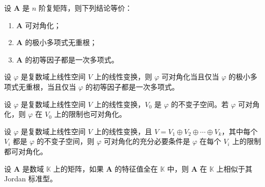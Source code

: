 \begin{corollary}
  设 $\bm{A}$ 是 $n$ 阶复矩阵，则下列结论等价：
  \begin{enumerate}
    \item $\bm{A}$ 可对角化；
    \item $\bm{A}$ 的极小多项式无重根；
    \item $\bm{A}$ 的初等因子都是一次多项式。
  \end{enumerate}
\end{corollary}

\begin{corollary}
  设 $\varphi$ 是复数域上线性空间 $V$ 上的线性变换，则 $\varphi$ 可对角化当且仅当 $\varphi$ 的极小多项式无重根，当且仅当 $\varphi$ 的初等因子都是一次多项式。
\end{corollary}

\begin{corollary}
  设 $\varphi$ 是复数域上线性空间 $V$ 上的线性变换，$V_0$ 是 $\varphi$ 的不变子空间。若 $\varphi$ 可对角化，则 $\varphi$ 在 $V_0$ 上的限制也可对角化。
\end{corollary}

\begin{corollary}
  设 $\varphi$ 是复数域上线性空间 $V$ 上的线性变换，且 $V = V_1 \oplus V_2 \oplus \cdots \oplus V_k$，其中每个 $V_i$ 都是 $\varphi$ 的不变子空间，则 $\varphi$ 可对角化的充分必要条件是 $\varphi$ 在每个 $V_i$ 上的限制都可对角化。
\end{corollary}

\begin{corollary}
  设 $\bm{A}$ 是数域 $\mathbb{K}$ 上的矩阵，如果 $\bm{A}$ 的特征值全在 $\mathbb{K}$ 中，则 $\bm{A}$ 在 $\mathbb{K}$ 上相似于其 Jordan 标准型。
\end{corollary}


\section{}







\section{}






